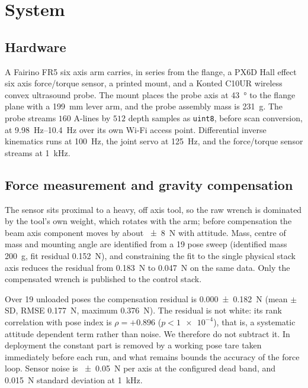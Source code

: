 \documentclass[conference]{IEEEtran}
\begin{document}
\section{System}
\label{sec:system}

\subsection{Hardware}

A Fairino FR5 six axis arm carries, in series from the flange, a PX6D Hall
effect six axis force/torque sensor, a printed mount, and a Konted C10UR
wireless convex ultrasound probe. The mount places the probe axis at
\SI{43}{\degree} to the flange plane with a \SI{199}{\milli\metre} lever arm,
and the probe assembly mass is \SI{231}{\gram}. The probe streams $160$ A-lines
by $512$ depth samples as \texttt{uint8}, before scan conversion, at
\SIrange{9.98}{10.4}{\hertz} over its own Wi-Fi access point. Differential
inverse kinematics runs at \SI{100}{\hertz}, the joint servo at
\SI{125}{\hertz}, and the force/torque sensor streams at \SI{1}{\kilo\hertz}.

\subsection{Force measurement and gravity compensation}

The sensor sits proximal to a heavy, off axis tool, so the raw wrench is
dominated by the tool's own weight, which rotates with the arm; before
compensation the beam axis component moves by about \SI{\pm 8}{\newton} with
attitude. Mass, centre of mass and mounting angle are identified from a
19 pose sweep (identified mass \SI{200}{\gram}, fit residual
\SI{0.152}{\newton}), and constraining the fit to the single physical stack axis
reduces the residual from \SI{0.183}{\newton} to \SI{0.047}{\newton} on the same
data. Only the compensated wrench is published to the control stack.

Over 19 unloaded poses the compensation residual is
\SI{0.000\pm0.182}{\newton} (mean $\pm$ SD, RMSE \SI{0.177}{\newton}, maximum
\SI{0.376}{\newton}). The residual is not white: its rank correlation with pose
index is $\rho = +0.896$ ($p < \num{1e-4}$), that is, a systematic attitude
dependent term rather than noise. We therefore do not subtract it. In deployment
the constant part is removed by a working pose tare taken immediately before
each run, and what remains bounds the accuracy of the force loop. Sensor noise
is \SI{\pm 0.05}{\newton} per axis at the configured dead band, and
\SI{0.015}{\newton} standard deviation at \SI{1}{\kilo\hertz}.
\end{document}
